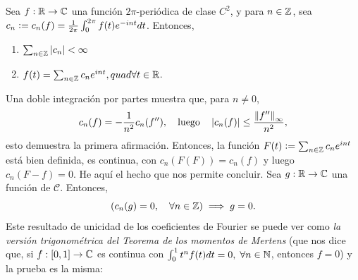 \begin{theo}
    Sea \(f:\mathbb{R} \to \mathbb{C} \) una función \(2\pi\)-periódica de clase \(C^2\), y para \(n \in \mathbb{Z} \), sea 
    \(c_n\vcentcolon = c_n(f) = \frac{1}{2\pi} \int_{0}^{2\pi} f(t) e^{-int } dt\). Entonces,
    \begin{enumerate}
        \item \(\sum_{n\in\mathbb{Z}}\left\lvert c_n\right\rvert < \infty\)
        \item \(f(t) = \sum_{n\in\mathbb{Z}} c_n e^{int},quad \forall t\in \mathbb{R}\).
    \end{enumerate}
\end{theo}
\begin{dem}
    Una doble integración por partes muestra que, para \(n \neq 0\), 
    \[
    c_n(f) = - \frac{1}{n^2}c_n(f''), \quad \text{luego} \quad \left\lvert c_n(f)\right\rvert \leq \frac{\left\lVert f''\right\rVert_{\infty}}{n^2},
    \]
    esto demuestra la primera afirmación. Entonces, la función \(F(t)\vcentcolon = \sum_{n\in \mathbb{Z}}c_n e^{int}\) está bien definida,
    es continua, con \(c_n(F(F)) = c_n(f)\) y luego \(c_n(F-f)= 0\). He aquí el hecho que nos permite concluir. Sea 
    \(g: \mathbb{R} \to \mathbb{C} \) una función de \(\mathcal{C}\). Entonces,
    \begin{equation}\label{coeficientes-fourier-cero}
        \left( c_n(g) = 0, \quad \forall n\in \mathbb{Z} \right) \implies g = 0.
    \end{equation}
    Este resultado de unicidad de los coeficientes de Fourier se puede ver como {\it la versión trigonométrica del Teorema de
    los momentos de Mertens} (que nos dice que, si \(f:[0,1]\to \mathbb{C}\) es continua con \(\int_{0}^{1}t^n f(t) dt = 0, \; \forall n\in \mathbb{N}\),
    entonces \(f=0\)) y la prueba es la misma: 
\end{dem}